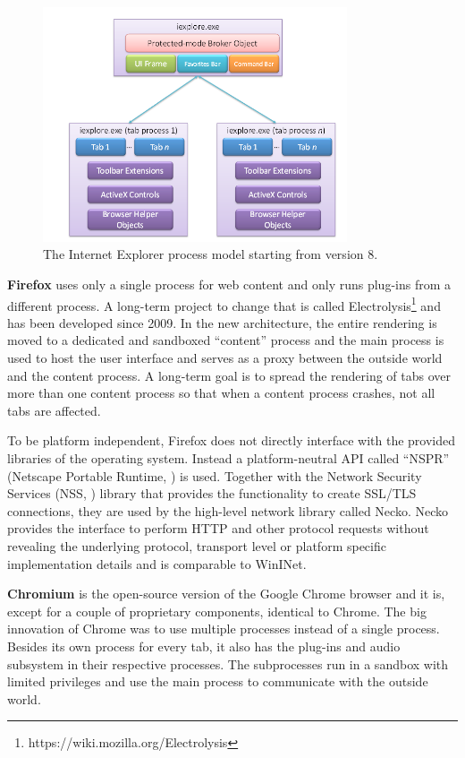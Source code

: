 \begin{figure}
    \centering
    \includegraphics[width=9cm]{Images/IE8_process_model.png}
    \caption{The Internet Explorer process model starting from version 8. \cite{IE8LCIEP}}
    \label{fig:ie8proc}
\end{figure}
\vspace{-2mm}

\textbf{Firefox} uses only a single process for web content and only runs plug-ins from a different process. A long-term project to change that is called Electrolysis\footnote{https://wiki.mozilla.org/Electrolysis} and has been developed since 2009. In the new architecture, the entire rendering is moved to a dedicated and sandboxed ``content'' process and the main process is used to host the user interface and serves as a proxy between the outside world and the content process. A long-term goal is to spread the rendering of tabs over more than one content process so that when a content process crashes, not all tabs are affected.

To be platform independent, Firefox does not directly interface with the provided libraries of the operating system. Instead a platform-neutral API called ``NSPR'' (Netscape Portable Runtime, \cite{nspr}) is used. Together with the Network Security Services (NSS, \cite{nss}) library that provides the functionality to create SSL/TLS connections, they are used by the high-level network library called Necko. Necko provides the interface to perform HTTP and other protocol requests without revealing the underlying protocol, transport level or platform specific implementation details and is comparable to WinINet.

\textbf{Chromium} is the open-source version of the Google Chrome browser and it is, except for a couple of proprietary components, identical to Chrome. The big innovation of Chrome \cite{ChromeMPA} was to use multiple processes instead of a single process. Besides its own process for every tab, it also has the plug-ins and audio subsystem in their respective processes. The subprocesses run in a sandbox with limited privileges and use the main process to communicate with the outside world.

